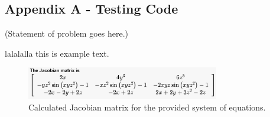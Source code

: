 \documentclass[10pt]{article}
\begin{document}
\subsection*{Appendix A - Testing Code}
(Statement of problem goes here.)

lalalalla this is example text.

\begin{figure}[h!]
\centering
\includegraphics[width=0.75\textwidth]{Jacobian.png}
\caption{Calculated Jacobian matrix for the provided system of equations.}
\end{figure}



\vspace{1in}
\end{document}
